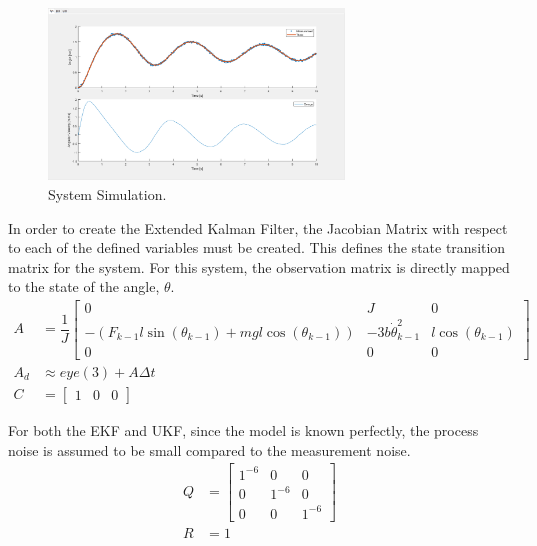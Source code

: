\documentclass[10pt]{article}
\begin{document}
\begin{enumerate}[label=\textbf{\arabic*.}]
  \begin{figure}[H]
    \centering
    \includegraphics[width=0.7\textwidth]{p1_sys.png}
    \caption{System Simulation.}
    \label{fig:1}
  \end{figure}

  In order to create the Extended Kalman Filter, the Jacobian Matrix with 
  respect to each of the defined variables must be created. This defines the 
  state transition matrix for the system. For this system, the observation 
  matrix is directly mapped to the state of the angle, $\theta$.
  \begin{equation}
    \begin{split}
      A &= \dfrac{1}{J}
      \begin{bmatrix}
        0 & J & 0 \\ 
        -(F_{k-1}l\sin{(\theta_{k-1})} + mgl\cos{(\theta_{k-1})}) & -3b\dot{\theta}_{k-1}^2 & l\cos{(\theta_{k-1})} \\
        0 & 0 & 0
      \end{bmatrix} \\
      A_d &\approx eye(3) + A\Delta t \\
      C &= \begin{bmatrix} 1 & 0 & 0 \end{bmatrix}
    \end{split}
    \label{eq:2}
  \end{equation}

  For both the EKF and UKF, since the model is known perfectly, the process 
  noise is assumed to be small compared to the measurement noise.
  \begin{equation}
    \begin{split}
      Q &= \begin{bmatrix} 1^{-6} & 0 & 0 \\ 0 & 1^{-6} & 0 \\ 0 & 0 & 1^{-6} \end{bmatrix} \\
      R &= 1
    \end{split}
    \label{eq:3}
  \end{equation}


\end{enumerate}
\end{document}

